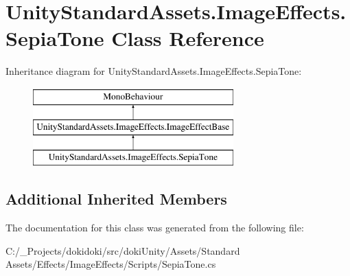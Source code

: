 \hypertarget{class_unity_standard_assets_1_1_image_effects_1_1_sepia_tone}{}\section{Unity\+Standard\+Assets.\+Image\+Effects.\+Sepia\+Tone Class Reference}
\label{class_unity_standard_assets_1_1_image_effects_1_1_sepia_tone}
Inheritance diagram for Unity\+Standard\+Assets.\+Image\+Effects.\+Sepia\+Tone\+:\begin{figure}[H]
\begin{center}
\leavevmode
\includegraphics[height=3.000000cm]{class_unity_standard_assets_1_1_image_effects_1_1_sepia_tone}
\end{center}
\end{figure}
\subsection*{Additional Inherited Members}


The documentation for this class was generated from the following file\+:\begin{DoxyCompactItemize}
\item 
C\+:/\+\_\+\+Projects/dokidoki/src/doki\+Unity/\+Assets/\+Standard Assets/\+Effects/\+Image\+Effects/\+Scripts/Sepia\+Tone.\+cs\end{DoxyCompactItemize}
